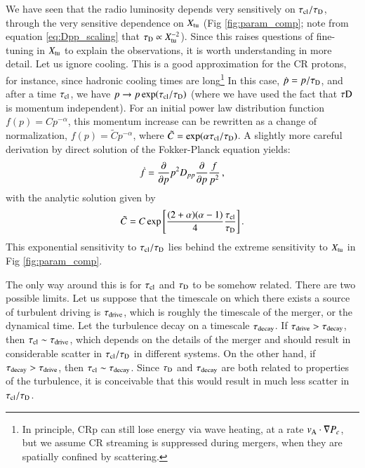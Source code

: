 \documentclass[fleqn,usenatbib,useAMS]{mnras}
\begin{document}
We have seen that the radio luminosity depends very sensitively on $\tau_{\rm cl}/\tau_{\rm D}$, through the very sensitive dependence on $X_{\rm tu}$ (Fig \ref{fig:param_comp}; note from equation \ref{eq:Dpp_scaling} that $\tau_{\rm D} \propto X_{\rm tu}^{-2}$). Since this raises questions of fine-tuning in $X_{\rm tu}$ to explain the observations, it is worth understanding in more detail. Let us ignore cooling. This is a good approximation for the CR protons, for instance, since hadronic cooling times are long\footnote{In principle, CRp can still lose energy via wave heating, at a rate $v_{\rm A} \cdot \nabla P_{c}$, but we assume CR streaming is suppressed during mergers, when they are spatially confined by scattering.} In this case, $\dot{p}= p/\tau_{\rm D}$, and after a time $\tau_{\rm cl}$, we have $p \rightarrow p \, {\rm exp}(\tau_{\rm cl}/\tau_{\rm D})$ (where we have used the fact that $\tau{\rm D}$ is momentum independent). For an initial power law distribution function $f(p) = C p^{-\alpha}$, this momentum increase can be rewritten as a change of normalization, $f(p) = \tilde{C} p^{-\alpha}$, where $\tilde{C} = {\rm exp}( \alpha \tau_{\rm cl}/\tau_{\rm D})$. A slightly more careful derivation by direct solution of the Fokker-Planck equation yields: 
\begin{equation}
  \dot{f} = {{\partial }\over{\partial p}}
  p^2 D_{pp} {{\partial }\over{\partial p}} \frac{f}{p^2}\,,
\end{equation}
with the analytic solution given by
\begin{equation}
  \label{eq:Creacc}
  \tilde{C}= 
  C \exp{\left[\frac{(2+\alpha)(\alpha-1)}{4}\frac{\tau_{\mathrm{cl}}}{\tau_{\mathrm{D}}}\right]}\,.
\end{equation}
This exponential sensitivity to $\tau_{\rm cl}/\tau_{\rm D}$ lies behind the extreme sensitivity to $X_{\rm tu}$ in Fig \ref{fig:param_comp}.

The only way around this is for $\tau_{\rm cl}$ and $\tau_{\rm D}$ to be somehow related. There are two possible limits. Let us suppose that the timescale on which there exists a source of turbulent driving is $\tau_{\rm drive}$, which is roughly the timescale of the merger, or the dynamical time. Let the turbulence decay on a timescale $\tau_{\rm decay}$. If $\tau_{\rm drive} > \tau_{\rm decay}$, then $\tau_{\rm cl} \sim \tau_{\rm drive}$, which depends on the details of the merger and should result in considerable scatter in $\tau_{\rm cl}/\tau_{\rm D}$ in different systems. On the other hand, if $\tau_{\rm decay} > \tau_{\rm drive}$, then $\tau_{\rm cl} \sim \tau_{\rm decay}$. Since $\tau_{\rm D}$ and $\tau_{\rm decay}$ are both related to properties of the turbulence, it is conceivable that this would result in much less scatter in $\tau_{\rm cl}/\tau_{\rm D}$. 
\end{document}
